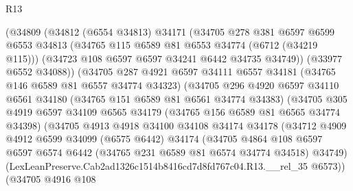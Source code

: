 \begin{lexlean}{R13}
\begin{coremodule}
                    (@34809
                      (@34812
                        (@6554 @34813)
                        @34171
                        (@34705
                          @278
                          @381
                          @6597
                          @6599
                          @6553
                          @34813
                          (@34765 @115 @6589 @81 @6553 @34774 (@6712 (@34219 @115)))
                          (@34723 @108 @6597 @6597 @34241 @6442 @34735 @34749))
                        (@33977 @6552 @34088))
                      (@34705
                        @287
                        @4921
                        @6597
                        @34111
                        @6557
                        @34181
                        (@34765 @146 @6589 @81 @6557 @34774 @34323)
                        (@34705
                          @296
                          @4920
                          @6597
                          @34110
                          @6561
                          @34180
                          (@34765 @151 @6589 @81 @6561 @34774 @34383)
                          (@34705
                            @305
                            @4919
                            @6597
                            @34109
                            @6565
                            @34179
                            (@34765 @156 @6589 @81 @6565 @34774 @34398)
                            (@34705
                              @4913
                              @4918
                              @34100
                              @34108
                              @34174
                              @34178
                              (@34712
                                @4909
                                @4912
                                @6599
                                @34099
                                (@6575 @6442)
                                @34174
                                (@34705
                                  @4864
                                  @108
                                  @6597
                                  @6597
                                  @6574
                                  @6442
                                  (@34765 @231 @6589 @81 @6574 @34774 @34518)
                                  @34749)
                                (LexLeanPreserve.Cab2ad1326c1514b8416cd7d8fd767c04.R13.__rel_35
                                  @6573))
                              (@34705
                                @4916
                                @108

\end{coremodule}
\end{lexlean}
